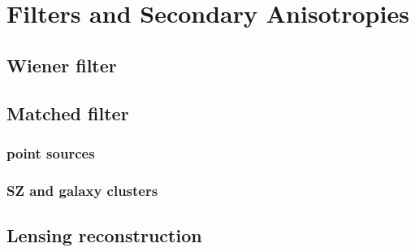\chapter{Filters and Secondary Anisotropies}


\section{Wiener filter}



\section{Matched filter}

\subsection{point sources}

\subsection{SZ and galaxy clusters}


\section{Lensing reconstruction}
